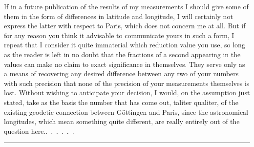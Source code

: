 \par\noindent\hspace*{\parindent}If in a future publication of the results of my measurements I should give some of them in the form of differences in latitude and longitude, I will certainly not express the latter with respect to Paris, which does not concern me at all. But if for any reason you think it advisable to communicate yours in such a form, I repeat that I consider it quite immaterial which reduction value you use, so long as the reader is left in no doubt that the fractions of a second appearing in the values can make no claim to exact significance in themselves. They serve only as a means of recovering any desired difference between any two of your numbers with such precision that none of the precision of your measurements themselves is lost. Without wishing to anticipate your decision, I would, on the assumption just stated, take as the basis the number that has come out, taliter qualiter, of the existing geodetic connection between Göttingen and Paris, since the astronomical longitudes, which mean something quite different, are really entirely out of the question here.\quad\mbox{.\ .\ .\ .\ .\ .}
\begin{center}\rule{.12\linewidth}{.4pt}\end{center}


